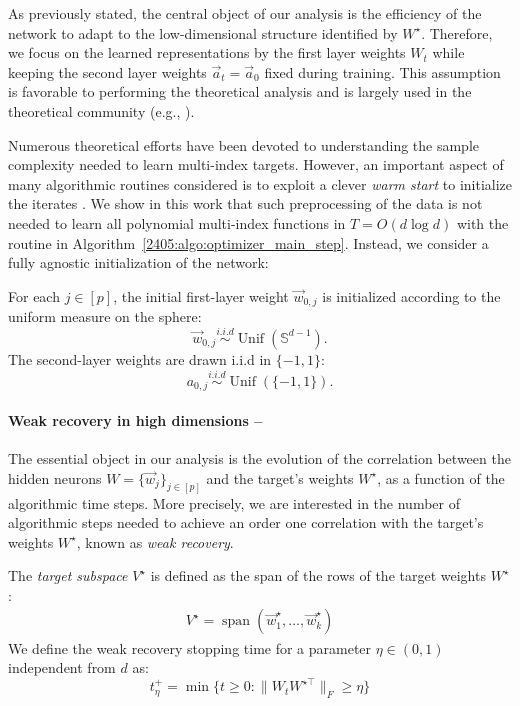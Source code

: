 As previously stated, the central object of our analysis is the efficiency of the network to adapt to the low-dimensional structure identified by $W^\star$. Therefore, we focus on the learned representations by the first layer weights $W_t$ while keeping the second layer weights $\vec a_t = \vec a_0$ fixed during training. This assumption is favorable to performing the theoretical analysis and is largely used in the theoretical community (e.g., \cite{damian2022neural,ba2022high,bietti2022learning}).

Numerous theoretical efforts have been devoted to understanding the sample complexity needed to learn multi-index targets. However, an important aspect of many algorithmic routines considered is to exploit a clever \textit{warm start} to initialize the iterates \citep{mondelli2018fundamental,luo2019optimal,maillard2020phase,chen2020learning}. We show in this work that such preprocessing of the data is not needed to learn all polynomial multi-index functions in $T=O(d \log d)$ with the routine in Algorithm~\ref{2405:algo:optimizer_main_step}. Instead, we consider a fully agnostic initialization of the network:

\begin{assumption}\label{2405:assump:init}
For each $j \in [p]$, the initial first-layer weight $\vec{w}_{0, j}$ is initialized according to the uniform measure on the sphere:
\[ \vec{w}_{0, j} \overset{i.i.d}{\sim}\operatorname{Unif}(\mathbb{S}^{d-1}). \]
The second-layer weights are drawn i.i.d in $\{-1, 1\}$:
\[ a_{0, j} \overset{i.i.d}{\sim}\operatorname{Unif}(\{-1, 1\}). \]
\end{assumption}

\paragraph{Weak recovery in high dimensions --}
The essential object in our analysis is the evolution of the correlation between the hidden neurons $W = \{\vec w_j\}_{j \in [p]}$ and the target's weights $W^\star$, as a function of the algorithmic time steps. More precisely, we are interested in the number of algorithmic steps needed to achieve an order one correlation with the target's weights $W^\star$, known as \textit{weak recovery}. 
\begin{definition}
\label{2405:def:weak_recovery}
    The \textit{target subspace} $V^\star$ is defined as the span of the rows of the target weights $W^\star$:
    \begin{align}
    \label{2405:eq:main:teacher_subspace_def}
        V^\star = \operatorname{span}(\vec w^\star_1, \dots, \vec w^\star_k)
    \end{align}
    We define the weak recovery stopping time for a parameter $\eta \in (0,1)$ independent from $d$ as:
\begin{equation}
    t^{+}_{\eta} = \min\{t \geq 0: \lVert W_t W^{\star \top} \rVert_F \geq \eta\}
\end{equation}
\end{definition}

